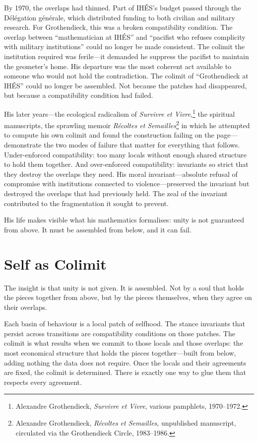 By 1970, the overlaps had thinned. Part of IH\'{E}S's budget passed through the D\'{e}l\'{e}gation g\'{e}n\'{e}rale, which distributed funding to both civilian and military research. For Grothendieck, this was a broken compatibility condition. The overlap between ``mathematician at IH\'{E}S'' and ``pacifist who refuses complicity with military institutions'' could no longer be made consistent. The colimit the institution required was ferile---it demanded he suppress the pacifist to maintain the geometer's home. His departure was the most coherent act available to someone who would not hold the contradiction. The colimit of ``Grothendieck at IH\'{E}S'' could no longer be assembled. Not because the patches had disappeared, but because a compatibility condition had failed.

His later years---the ecological radicalism of \emph{Survivre et Vivre},\footnote{Alexandre Grothendieck, \emph{Survivre et Vivre}, various pamphlets, 1970--1972.} the spiritual manuscripts, the sprawling memoir \emph{R\'{e}coltes et Semailles}\footnote{Alexandre Grothendieck, \emph{R\'{e}coltes et Semailles}, unpublished manuscript, circulated via the Grothendieck Circle, 1983--1986.} in which he attempted to compute his own colimit and found the construction failing on the page---demonstrate the two modes of failure that matter for everything that follows. Under-enforced compatibility: too many locals without enough shared structure to hold them together. And over-enforced compatibility: invariants so strict that they destroy the overlaps they need. His moral invariant---absolute refusal of compromise with institutions connected to violence---preserved the invariant but destroyed the overlaps that had previously held. The zeal of the invariant contributed to the fragmentation it sought to prevent.

His life makes visible what his mathematics formalises: unity is not guaranteed from above. It must be assembled from below, and it can fail.


\section{Self as Colimit}

The insight is that unity is not given. It is assembled. Not by a soul that holds the pieces together from above, but by the pieces themselves, when they agree on their overlaps.

Each basin of behaviour is a local patch of selfhood. The stance invariants that persist across transitions are compatibility conditions on those patches. The colimit is what results when we commit to those locals and those overlaps: the most economical structure that holds the pieces together---built from below, adding nothing the data does not require. Once the locals and their agreements are fixed, the colimit is determined. There is exactly one way to glue them that respects every agreement.

